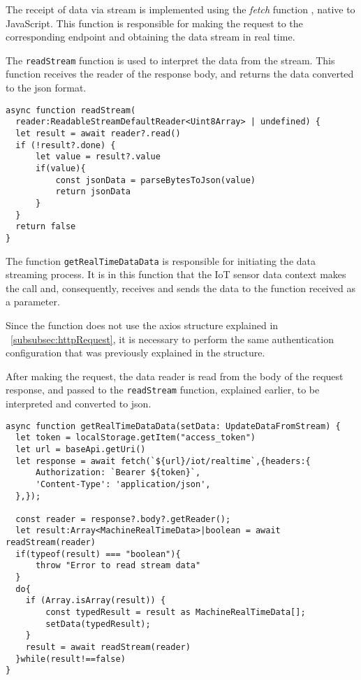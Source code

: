 The receipt of data via stream is implemented using the \textit{fetch} function \cite{mdnFetchAPI}, native to JavaScript. This function is responsible for making the request to the corresponding endpoint and obtaining the data stream in real time.

The \texttt{readStream} function is used to interpret the data from the stream. This function receives the reader of the response body, and returns the data converted to the \gls{json} format.

\begin{Verbatim}[fontsize=\small, baselinestretch=0.8]
async function readStream(
  reader:ReadableStreamDefaultReader<Uint8Array> | undefined) {
  let result = await reader?.read()
  if (!result?.done) {
      let value = result?.value
      if(value){
          const jsonData = parseBytesToJson(value)        
          return jsonData
      }
  }
  return false
}
\end{Verbatim}

The function \texttt{getRealTimeDataData} is responsible for initiating the data streaming process. It is in this function that the IoT sensor data context makes the call and, consequently, receives and sends the data to the function received as a parameter.

Since the function does not use the axios structure explained in ~\ref{subsubsec:httpRequest}, it is necessary to perform the same authentication configuration that was previously explained in the structure.

After making the request, the data reader is read from the body of the request response, and passed to the \texttt{readStream} function, explained earlier, to be interpreted and converted to \gls{json}.

\begin{Verbatim}[fontsize=\small, baselinestretch=0.8]
async function getRealTimeDataData(setData: UpdateDataFromStream) {
  let token = localStorage.getItem("access_token")
  let url = baseApi.getUri()
  let response = await fetch(`${url}/iot/realtime`,{headers:{
      Authorization: `Bearer ${token}`,
      'Content-Type': 'application/json',
  },});

  const reader = response?.body?.getReader();
  let result:Array<MachineRealTimeData>|boolean = await readStream(reader)
  if(typeof(result) === "boolean"){
      throw "Error to read stream data"
  }
  do{
    if (Array.isArray(result)) {
        const typedResult = result as MachineRealTimeData[];
        setData(typedResult);
    }
    result = await readStream(reader)
  }while(result!==false)
}
\end{Verbatim}

